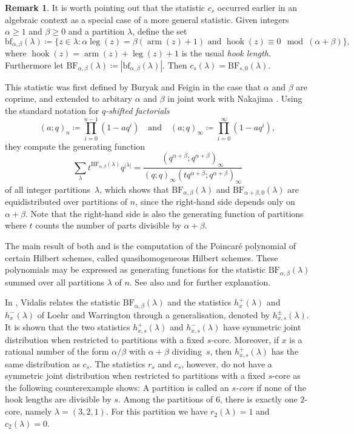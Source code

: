 \documentclass[12pt,reqno]{amsart}
\numberwithin{equation}{section}
\theoremstyle{definition}
\newtheorem{remark}[theorem]{Remark}
\newcommand{\Dfn}[1]{\emph{\color{blue}#1}} %
\DeclareMathOperator{\leg}{leg}
\DeclareMathOperator{\arm}{arm}
\DeclareMathOperator{\hook}{hook}
\begin{document}
\begin{remark} \label{rem:BF}
	It is worth pointing out that the statistic $c_s$ occurred earlier in an algebraic context as a special case of a more general statistic.  Given integers $\alpha\geq 1$ and $\beta\geq 0$ and a partition $\lambda$, define the set 
	\[
	\mathrm{bf}_{\alpha,\beta}(\lambda)
	\coloneq \{z\in\lambda : 
	\text{$\alpha \leg(z)=\beta(\arm(z)+1)$ and $\hook(z)\equiv 0 \mod{(\alpha+\beta)}$}\},
	\]
	where $\hook(z)=\arm(z) + \leg(z) + 1$ is the usual \Dfn{hook length}.  Furthermore let
	$\mathrm{BF}_{\alpha,\beta}(\lambda)\coloneq|\mathrm{bf}_{\alpha,\beta}(\lambda)|$.  Then $c_s(\lambda) = \mathrm{BF}_{s,0}(\lambda)$.
	
	This statistic was first defined by Buryak and Feigin \cite{BF13}
	in the case that $\alpha$ and $\beta$ are coprime, and extended to arbitary
	$\alpha$ and $\beta$ in joint work with Nakajima \cite{BFN15}. Using the  standard notation for \Dfn{$q$-shifted factorials}
	\[
	(a;q)_n \coloneq \prod_{i=0}^{n-1}(1-a q^i) \quad\text{and}\quad (a;q)_\infty \coloneq \prod_{i=0}^{\infty}(1-a q^i),
	\]
	they compute the generating function 
	\[
	\sum_{\lambda}t^{\mathrm{BF}_{\alpha,\beta}(\lambda)}q^{|\lambda|}
	=\frac{(q^{\alpha+\beta};q^{\alpha+\beta})_\infty}
	{(q;q)_{\infty}(tq^{\alpha+\beta};q^{\alpha+\beta})_\infty}
	\]
	of all integer partitions~$\lambda$, which shows that $\mathrm{BF}_{\alpha,\beta}(\lambda)$ and 
	$\mathrm{BF}_{\alpha+\beta,0}(\lambda)$ are equidistributed over partitions of $n$,
	since the right-hand side depends only on $\alpha+\beta$.
	Note that the right-hand side is also the generating function of partitions where $t$ counts the number of parts divisible by $\alpha+\beta$.
	
	The main result of both \cite{BF13} and \cite{BFN15} is the computation of the Poincar\'e polynomial of certain Hilbert schemes, called quasihomogeneous Hilbert schemes. These polynomials may be expressed as generating functions
	for the statistic $\mathrm{BF}_{\alpha,\beta}(\lambda)$ summed over all partitions $\lambda$ of $n$.
	See also \cite{Vid23} and \cite{WW20} for further explanation.

	In \cite{Vid23}, Vidalis relates the statistic 
	$\mathrm{BF}_{\alpha,\beta}(\lambda)$ and the statistics 
	$h_x^+(\lambda)$ and $h_x^-(\lambda)$ of Loehr and Warrington
	through a generalisation, denoted by $h_{x,s}^\pm(\lambda)$.
	It is shown that
	the two statistics $h_{x,s}^+(\lambda)$ and $h_{x,s}^-(\lambda)$ have symmetric
	joint distribution when restricted to partitions with a fixed $s$-core. Moreover, if $x$ is a rational number of the form
	$\alpha/\beta$ with $\alpha+\beta$ dividing~$s$, then $h_{x,s}^+(\lambda)$
	has the same distribution as $c_s$.
	The statistics $r_s$ and $c_s$, however, do not have a symmetric joint distribution when restricted to partitions with a fixed $s$-core as the following counterexample shows: A partition is called an \Dfn{$s$-core} if none of the hook lengths are divisible by $s$. Among the partitions of $6$, there is exactly one $2$-core, namely $\lambda=(3,2,1)$. For this partition we have $r_2(\lambda)=1$ and $c_2(\lambda)=0$.
\end{remark}
\end{document}
